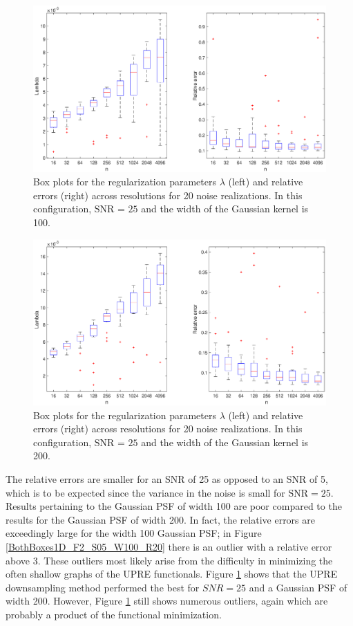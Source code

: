 \documentclass[12pt]{article}
\newcommand{\regparam}{\lambda}
\begin{document}
\begin{figure}
	\centerline{\includegraphics[scale = 0.4]{Figures/BothBoxes1D_F2_S25_W100_R20.eps}}
\caption{Box plots for the regularization parameters $\regparam$ (left) and relative errors (right) across resolutions for 20 noise realizations. In this configuration, $\text{SNR = 25}$ and the width of the Gaussian kernel is 100.}
\end{figure}

\begin{figure}
	\centerline{\includegraphics[scale = 0.4]{Figures/BothBoxes1D_F2_S25_W200_R20.eps}}
\caption{Box plots for the regularization parameters $\regparam$ (left) and relative errors (right) across resolutions for 20 noise realizations. In this configuration, $\text{SNR = 25}$ and the width of the Gaussian kernel is 200.}
\label{BothBoxes1D_F2_S25_W200_R20}
\end{figure}

The relative errors are smaller for an SNR of 25 as opposed to an SNR of 5, which is to be expected since the variance in the noise is small for $\text{SNR} = 25$. Results pertaining to the Gaussian PSF of width 100 are poor compared to the results for the Gaussian PSF of width 200. In fact, the relative errors are exceedingly large for the width 100 Gaussian PSF; in Figure \ref{BothBoxes1D_F2_S05_W100_R20} there is an outlier with a relative error above 3. These outliers most likely arise from the difficulty in minimizing the often shallow graphs of the UPRE functionals. Figure \ref{BothBoxes1D_F2_S25_W200_R20} shows that the UPRE downsampling method performed the best for $SNR = 25$ and a Gaussian PSF of width 200. However, Figure \ref{BothBoxes1D_F2_S25_W200_R20} still shows numerous outliers, again which are probably a product of the functional minimization. 
\end{document}
